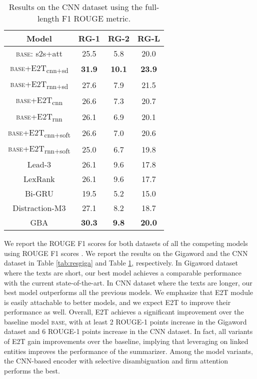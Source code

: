 \documentclass[11pt,a4paper]{article}
\begin{document}
\begin{table}[t]
\centering
    \begin{tabular}{|c|ccc|}
    \hline
    Model & RG-1    & RG-2    & RG-L \\
    \hline
    \hline
    \textsc{base}: s2s+att & 25.5 & 5.8 & 20.0 \\
    \hline
    \textsc{base}+E2T\textsubscript{cnn+sd} & \textbf{31.9} & \textbf{10.1} & \textbf{23.9} \\
    \textsc{base}+E2T\textsubscript{rnn+sd} & 27.6 & 7.9 & 21.5 \\
    \hline
    \textsc{base}+E2T\textsubscript{cnn} & 26.6 & 7.3 & 20.7 \\
    \textsc{base}+E2T\textsubscript{rnn} & 26.1 & 6.9 & 20.1 \\
    \textsc{base}+E2T\textsubscript{cnn+soft}  & 26.6 & 7.0 & 20.6 \\
    \textsc{base}+E2T\textsubscript{rnn+soft} & 25.0 & 6.7 & 19.8 \\
    \hline
    \hline
    Lead-3 & 26.1 & 9.6 & 17.8 \\
    LexRank & 26.1 & 9.6 & 17.7 \\
    \hline
    Bi-GRU & 19.5 & 5.2 & 15.0 \\
    Distraction-M3 & 27.1 & 8.2 & 18.7 \\
    GBA & \textbf{30.3} & \textbf{9.8} & \textbf{20.0} \\
    \hline
    \end{tabular}\caption{Results on the CNN dataset using the full-length F1 ROUGE metric. 
}
  \label{tab:rescnn}\end{table}

We report the ROUGE F1 scores for both datasets of all the competing models using ROUGE F1 scores \cite{lin2004rouge}. We report the results on the Gigaword and the CNN dataset in Table \ref{tab:resgiga} and Table \ref{tab:rescnn}, respectively.
In Gigaword dataset where the texts are short, our best model achieves a comparable performance with the current state-of-the-art. 
In CNN dataset where the texts are longer, our best model outperforms all the previous models.
We emphasize that E2T module is easily attachable to better models, and we expect E2T to improve their performance as well.
Overall, E2T achieves a significant improvement over the baseline model \textsc{base}, with at least 2 ROUGE-1 points increase in the Gigaword dataset and 6 ROUGE-1 points increase in the CNN dataset.
In fact, all variants of E2T gain improvements over the baseline, implying that leveraging on linked entities improves the performance of the summarizer. Among the model variants, the CNN-based encoder with selective disambiguation and firm attention performs the best.
\end{document}
